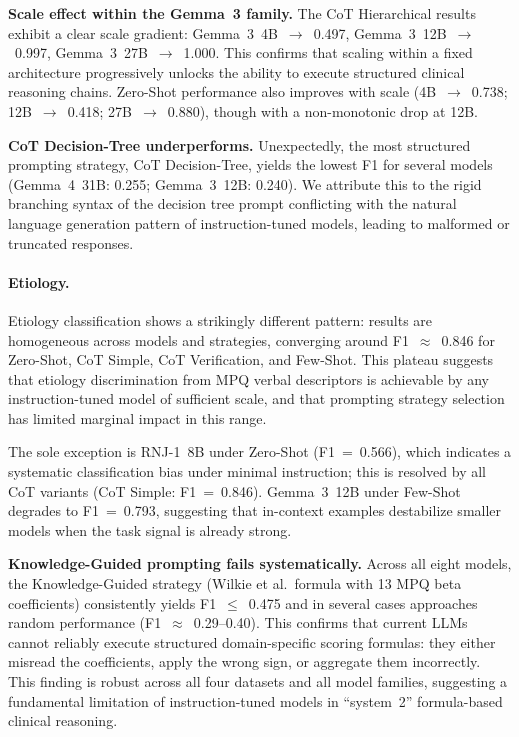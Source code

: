 \documentclass[preprint,12pt,authoryear]{elsarticle}
\begin{document}
\textbf{Scale effect within the Gemma~3 family.}
The CoT Hierarchical results exhibit a clear scale gradient: Gemma~3~4B~$\to$~0.497, Gemma~3~12B~$\to$~0.997, Gemma~3~27B~$\to$~1.000. This confirms that scaling within a fixed architecture progressively unlocks the ability to execute structured clinical reasoning chains. Zero-Shot performance also improves with scale (4B~$\to$~0.738; 12B~$\to$~0.418; 27B~$\to$~0.880), though with a non-monotonic drop at 12B.

\textbf{CoT Decision-Tree underperforms.}
Unexpectedly, the most structured prompting strategy, CoT Decision-Tree, yields the lowest F1 for several models (Gemma~4~31B: 0.255; Gemma~3~12B: 0.240). We attribute this to the rigid branching syntax of the decision tree prompt conflicting with the natural language generation pattern of instruction-tuned models, leading to malformed or truncated responses.

\paragraph{Etiology.}
Etiology classification shows a strikingly different pattern: results are homogeneous across models and strategies, converging around F1~$\approx$~0.846 for Zero-Shot, CoT Simple, CoT Verification, and Few-Shot. This plateau suggests that etiology discrimination from MPQ verbal descriptors is achievable by any instruction-tuned model of sufficient scale, and that prompting strategy selection has limited marginal impact in this range.

The sole exception is {RNJ-1~8B} under Zero-Shot (F1~=~0.566), which indicates a systematic classification bias under minimal instruction; this is resolved by all CoT variants (CoT Simple: F1~=~0.846). Gemma~3~12B under Few-Shot degrades to F1~=~0.793, suggesting that in-context examples destabilize smaller models when the task signal is already strong.

\textbf{Knowledge-Guided prompting fails systematically.}
Across all eight models, the Knowledge-Guided strategy (Wilkie et al.\ formula with 13 MPQ beta coefficients) consistently yields F1~$\leq$~0.475 and in several cases approaches random performance (F1~$\approx$~0.29--0.40). This confirms that current LLMs cannot reliably execute structured domain-specific scoring formulas: they either misread the coefficients, apply the wrong sign, or aggregate them incorrectly. This finding is robust across all four datasets and all model families, suggesting a fundamental limitation of instruction-tuned models in ``system~2'' formula-based clinical reasoning.
\end{document}
